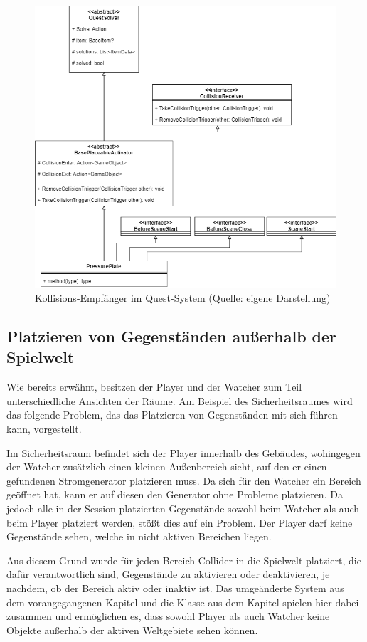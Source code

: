 \begin{figure}[ht]
\centering
\includegraphics[width=0.8\linewidth]{content/pictures/Quest-Extension.drawio.png}
\caption{Kollisions-Empfänger im Quest-System (Quelle: eigene Darstellung)}
\label{fig:new-collision-system-in-quests}
\end{figure}

\subsection{Platzieren von Gegenständen außerhalb der Spielwelt}\label{sec:difficulties-placement}
Wie bereits erwähnt, besitzen der Player und der Watcher zum Teil unterschiedliche Ansichten der Räume. Am Beispiel des Sicherheitsraumes wird das folgende Problem, das das Platzieren von Gegenständen mit sich führen kann, vorgestellt. 

Im Sicherheitsraum befindet sich der Player innerhalb des Gebäudes, wohingegen der Watcher zusätzlich einen kleinen Außenbereich sieht, auf den er einen gefundenen Stromgenerator platzieren muss. Da sich für den Watcher ein Bereich geöffnet hat, kann er auf diesen den Generator ohne Probleme platzieren. Da jedoch alle in der Session platzierten Gegenstände sowohl beim Watcher als auch beim Player platziert werden, stößt dies auf ein Problem. Der Player darf keine Gegenstände sehen, welche in nicht aktiven Bereichen liegen. 

Aus diesem Grund wurde für jeden Bereich Collider in die Spielwelt platziert, die dafür verantwortlich sind, Gegenstände zu aktivieren oder deaktivieren, je nachdem, ob der Bereich aktiv oder inaktiv ist. Das umgeänderte System aus dem vorangegangenen Kapitel  und die Klasse  aus dem Kapitel  spielen hier dabei zusammen und ermöglichen es, dass sowohl Player als auch Watcher keine  Objekte außerhalb der aktiven Weltgebiete sehen können.

